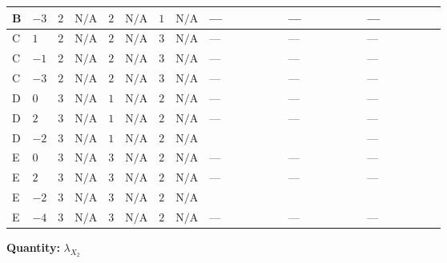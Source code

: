 \documentclass[8pt]{article}
\begin{document}
\begin{landscape}
\begin{longtable}{@{}llcccccc >{\raggedright\arraybackslash}p{0.21\linewidth} >{\raggedright\arraybackslash}p{0.21\linewidth} >{\raggedright\arraybackslash}p{0.21\linewidth}@{}}
\midrule
B & $-3$ & $2$ & $\text{N/A}$ & $2$ & $\text{N/A}$ & $1$ & $\text{N/A}$ & --- & --- & --- \\
\midrule
C & $1$ & $2$ & $\text{N/A}$ & $2$ & $\text{N/A}$ & $3$ & $\text{N/A}$ & --- & --- & --- \\
\midrule
C & $-1$ & $2$ & $\text{N/A}$ & $2$ & $\text{N/A}$ & $3$ & $\text{N/A}$ & --- & --- & --- \\
\midrule
C & $-3$ & $2$ & $\text{N/A}$ & $2$ & $\text{N/A}$ & $3$ & $\text{N/A}$ & --- & --- & --- \\
\midrule
D & $0$ & $3$ & $\text{N/A}$ & $1$ & $\text{N/A}$ & $2$ & $\text{N/A}$ & --- & --- & --- \\
\midrule
D & $2$ & $3$ & $\text{N/A}$ & $1$ & $\text{N/A}$ & $2$ & $\text{N/A}$ & --- & --- & --- \\
\midrule
D & $-2$ & $3$ & $\text{N/A}$ & $1$ & $\text{N/A}$ & $2$ & $\text{N/A}$ & \scriptsize\adjustbox{max width=\linewidth}{$\begin{gathered} +4 {\lambda_{HS_2}^{(1)}} {\lambda_{X_{16}}}\end{gathered}$} & \scriptsize\adjustbox{max width=\linewidth}{$\begin{gathered} +18 {\lambda_{S_2}^{(1)}} {\lambda_{X_{2}}}\end{gathered}$} & --- \\
\midrule
E & $0$ & $3$ & $\text{N/A}$ & $3$ & $\text{N/A}$ & $2$ & $\text{N/A}$ & --- & --- & --- \\
\midrule
E & $2$ & $3$ & $\text{N/A}$ & $3$ & $\text{N/A}$ & $2$ & $\text{N/A}$ & --- & --- & --- \\
\midrule
E & $-2$ & $3$ & $\text{N/A}$ & $3$ & $\text{N/A}$ & $2$ & $\text{N/A}$ & \scriptsize\adjustbox{max width=\linewidth}{$\begin{gathered} +4 {\lambda_{HS_2}^{(1)}} {\lambda_{X_{16}}}\end{gathered}$} & \scriptsize\adjustbox{max width=\linewidth}{$\begin{gathered} +22 {\lambda_{S_2}^{(1)}} {\lambda_{X_{2}}}\end{gathered}$} & \scriptsize\adjustbox{max width=\linewidth}{$\begin{gathered} +{\lambda_{12}^{(1)}} (6 {\lambda_{X_{7}}^{(1)}}+2 {\lambda_{X_{7}}^{(2)}})\end{gathered}$} \\
\midrule
E & $-4$ & $3$ & $\text{N/A}$ & $3$ & $\text{N/A}$ & $2$ & $\text{N/A}$ & --- & --- & --- \\
\midrule
\bottomrule
\end{longtable}
\clearpage
\noindent\textbf{Quantity: }${\lambda_{X_{2}}}$\par\smallskip

\end{landscape}
\end{document}
